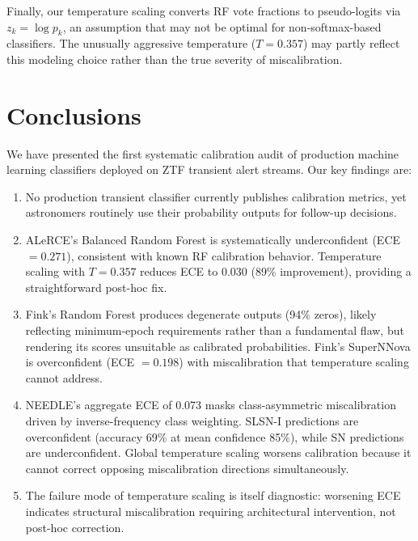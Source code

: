 \documentclass[twocolumn]{aastex631}
\begin{document}
Finally, our temperature scaling converts RF vote fractions to pseudo-logits via $z_k = \log p_k$, an assumption that may not be optimal for non-softmax-based classifiers. The unusually aggressive temperature ($T = 0.357$) may partly reflect this modeling choice rather than the true severity of miscalibration.


\section{Conclusions} \label{sec:conclusions}

We have presented the first systematic calibration audit of production machine learning classifiers deployed on ZTF transient alert streams. Our key findings are:

\begin{enumerate}
    \item No production transient classifier currently publishes calibration metrics, yet astronomers routinely use their probability outputs for follow-up decisions.

    \item ALeRCE's Balanced Random Forest is systematically underconfident (ECE $= 0.271$), consistent with known RF calibration behavior. Temperature scaling with $T = 0.357$ reduces ECE to 0.030 (89\% improvement), providing a straightforward post-hoc fix.

    \item Fink's Random Forest produces degenerate outputs (94\% zeros), likely reflecting minimum-epoch requirements rather than a fundamental flaw, but rendering its scores unsuitable as calibrated probabilities. Fink's SuperNNova is overconfident (ECE $= 0.198$) with miscalibration that temperature scaling cannot address.

    \item NEEDLE's aggregate ECE of 0.073 masks class-asymmetric miscalibration driven by inverse-frequency class weighting. SLSN-I predictions are overconfident (accuracy 69\% at mean confidence 85\%), while SN predictions are underconfident. Global temperature scaling worsens calibration because it cannot correct opposing miscalibration directions simultaneously.

    \item The failure mode of temperature scaling is itself diagnostic: worsening ECE indicates structural miscalibration requiring architectural intervention, not post-hoc correction.
\end{enumerate}
\end{document}
